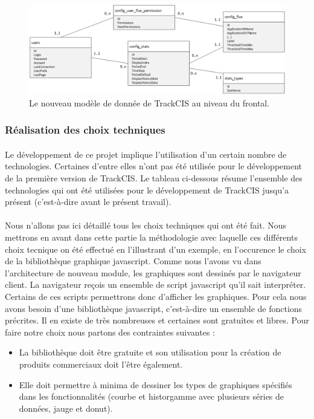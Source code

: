 			\begin{figure}[H]
				\centering
				\includegraphics[width=16cm]{../img/part3/modele_donnee.png}
				\caption{\label{modele_donnee} Le nouveau modèle de donnée de TrackCIS au
				niveau du frontal.}
			\end{figure}
			
		\subsubsection{Réalisation des choix techniques}
			\paragraph{}%
			Le développement de ce projet implique l'utilisation d'un certain nombre de
			technologies. Certaines d'entre elles n'ont pas été utilisée pour le
			développement de la première version de TrackCIS.
			Le tableau ci-dessous résume l'ensemble des technologies qui ont été
			utilisées pour le développement de TrackCIS jusqu'a présent (c'est-à-dire
			avant le présent travail).
			
			\paragraph{}%
			Nous n'allons pas ici détaillé tous les choix techniques qui ont été fait.
			Nous mettrons en avant dans cette partie la méthodologie avec laquelle ces
			différents choix tecnique on été effectué en l'illustrant d'un exemple, en
			l'occurence le choix de la bibliothèque graphique javascript. Comme nous
			l'avons vu dans l'architecture de nouveau module, les graphiques sont
			dessinés par le navigateur client. La navigateur reçois un ensemble de script
			javascript qu'il sait interpréter. Certains de ces scripts permettrons donc
			d'afficher les graphiques. Pour cela nous avons besoin d'une bibliothèque
			javascript, c'est-à-dire un ensemble de fonctions précrites. Il en existe de
			très nombreuses et certaines sont gratuites et libres. Pour faire notre choix
			nous partons des contraintes suivantes :
			\begin{itemize}
			  \item La bibliothèque doit être gratuite et son utilisation pour la
			  création de produits commerciaux doit l'être également.
			  \item Elle doit permettre à minima de dessiner les types de graphiques
			  spécifiés dans les fonctionnalités (courbe et historgamme avec plusieurs
			  séries de données, jauge et donut).
			\end{itemize}
			
